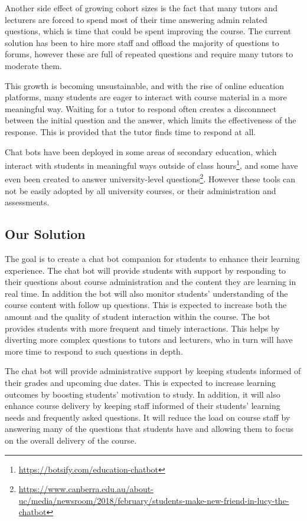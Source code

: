 \documentclass{article}
\begin{document}
Another side effect of growing cohort sizes is the fact that many tutors and lecturers are forced to spend most of their time answering admin related questions, which is time that could be spent improving the course. The current solution has been to hire more staff and offload the majority of questions to forums, however these are full of repeated questions and require many tutors to moderate them.

This growth is becoming unsustainable, and with the rise of online education platforms, many students are eager to interact with course material in a more meaningful way. Waiting for a tutor to respond often creates a disconnnect between the initial question and the answer, which limits the effectiveness of the response. This is provided that the tutor finds time to respond at all.

Chat bots have been deployed in some areas of secondary education, which interact with students in meaningful ways outside of class hours\footnote{\url{https://botsify.com/education-chatbot}}, and some have even been created to answer university-level questions\footnote{\url{https://www.canberra.edu.au/about-uc/media/newsroom/2018/february/students-make-new-friend-in-lucy-the-chatbot}}. However these tools can not be easily adopted by all university courses, or their administration and assessments.

\subsection{Our Solution}

The goal is to create a chat bot companion for students to enhance their learning experience. The chat bot will provide students with support by responding to their questions about course administration and the content they are learning in real time. In addition the bot will also monitor students' understanding of the course content with follow up questions. This is expected to increase both the amount and the quality of student interaction within the course. The bot provides students with more frequent and timely interactions. This helps by diverting more complex questions to tutors and lecturers, who in turn will have more time to respond to such questions in depth. 

The chat bot will provide administrative support by keeping students informed of their grades and upcoming due dates. This is expected to increase learning outcomes by boosting students' motivation to study. In addition, it will also enhance course delivery by keeping staff informed of their students' learning needs and frequently asked questions. It will reduce the load on course staff by answering many of the questions that students have and allowing them to focus on the overall delivery of the course. 
\end{document}
